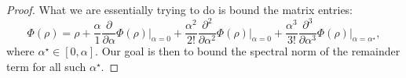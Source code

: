 \documentclass{article}
\newcommand{\parens}[1]{\left( #1 \right)}
\newcommand{\norm}[1]{\left| \left| #1 \right| \right|}
\begin{document}
\begin{proof}
What we are essentially trying to do is bound the matrix entries:
\begin{equation}
    \Phi(\rho) = \rho + \frac{\alpha}{1} \frac{\partial}{\partial \alpha} \Phi(\rho) \bigg|_{\alpha = 0} + \frac{\alpha^2}{2!} \frac{\partial^2}{\partial \alpha^2} \Phi(\rho) \bigg|_{\alpha = 0} + \frac{\alpha^3}{3!} \frac{\partial^3}{\partial \alpha^3} \Phi(\rho) \bigg|_{\alpha = \alpha^\star},\label{eq:remExpress}
\end{equation}
where $\alpha^\star \in [0, \alpha]$. Our goal is then to bound the spectral norm of the remainder term for all such $\alpha^\star$.




\end{proof}
\end{document}

